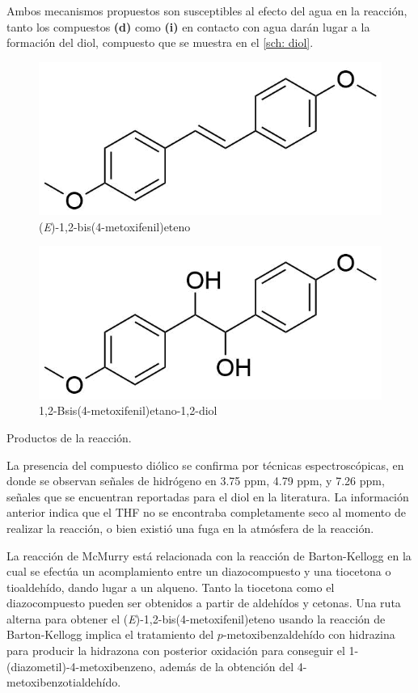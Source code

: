 \documentclass[fleqn,11pt]{SelfArx}
\begin{document}
Ambos mecanismos propuestos son susceptibles al efecto del agua en la reacci\'on, tanto los compuestos \textbf{(d)} como \textbf{(i)} en contacto con agua dar\'an lugar a la formaci\'on del diol, compuesto que se muestra en el \autoref{sch: diol}.
\begin{scheme}[h]
	\centering
	\scriptsize
	\begin{subfigure}[t]{0.49\linewidth}
		\centering
		\includegraphics[width=0.9\linewidth]{structures/product.png}
		\caption{(\textit{E})-1,2-bis(4-metoxifenil)eteno}
		\label{sch: producto}
	\end{subfigure}
	\begin{subfigure}[t]{0.49\linewidth}
		\centering
		\includegraphics[width=0.9\linewidth]{structures/product2.png}
		\caption{1,2-Bsis(4-metoxifenil)etano-1,2-diol}
		\label{sch: diol}
	\end{subfigure}
	\caption{Productos de la reacci\'on.}
\end{scheme}

La presencia del compuesto di\'olico se confirma por t\'ecnicas espectrosc\'opicas, en donde se observan señales de hidr\'ogeno en 3.75 ppm, 4.79 ppm, y 7.26 ppm, señales que se encuentran reportadas para el diol en la literatura\cite{Uchiyama2004}. La informaci\'on anterior indica que el THF no se encontraba completamente seco al momento de realizar la reacci\'on, o bien existi\'o una fuga en la atm\'osfera de la reacci\'on.

La reacci\'on de McMurry est\'a relacionada con la reacci\'on de Barton-Kellogg en la cual se efect\'ua un acomplamiento entre un diazocompuesto y una tiocetona o tioaldeh\'ido, dando lugar a un alqueno. Tanto la tiocetona como el diazocompuesto pueden ser obtenidos a partir de aldeh\'idos y cetonas\cite{Barton1970, Kellogg1970, Wang2010}. Una ruta alterna para obtener el (\textit{E})-1,2-bis(4-metoxifenil)eteno usando la reacci\'on de Barton-Kellogg implica el tratamiento del $p$-metoxibenzaldeh\'ido con hidrazina para producir la hidrazona con posterior oxidaci\'on para conseguir el 1-(diazometil)-4-metoxibenzeno, adem\'as de la obtenci\'on del 4-metoxibenzotialdeh\'ido.
\end{document}
